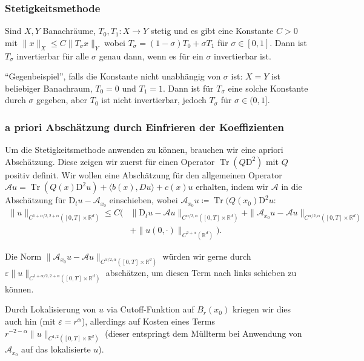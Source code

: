 \documentclass[11pt,a4paper]{scrartcl}
\newcommand{\R}{\mathbb{R}} %
\newcommand{\A}{\mathcal{A}}
\theoremstyle{plain}
\theoremstyle{definition}
\theoremstyle{remark}
\DeclareMathOperator{\Tr}{Tr}
\begin{document}
\subsubsection{Stetigkeitsmethode}

Sind $X,Y$ Banachräume, $T_0,T_1:X\to Y$ stetig und es gibt eine Konstante $C>0$ mit $\|x\|_X \leq C \|T_\sigma x\|_Y$ wobei $T_\sigma = (1-\sigma) T_0 + \sigma T_1$ für $\sigma\in [0,1]$. Dann ist $T_\sigma$ invertierbar für alle $\sigma$ genau dann, wenn es für ein $\sigma$ invertierbar ist.

\enquote{Gegenbeispiel}, falls die Konstante nicht unabhängig von $\sigma$ ist: $X=Y$ ist beliebiger Banachraum, $T_0=0$ und $T_1=1$. Dann ist für $T_\sigma$ eine solche Konstante durch $\sigma$ gegeben, aber $T_0$ ist nicht invertierbar, jedoch $T_\sigma$ für $\sigma\in (0,1]$.

\subsubsection{a priori Abschätzung durch Einfrieren der Koeffizienten}

Um die Stetigkeitsmethode anwenden zu können, brauchen wir eine apriori Abschätzung. Diese zeigen wir zuerst für einen Operator $\Tr(Q\mathrm{D}^2)$ mit $Q$ positiv definit. Wir wollen eine Abschätzung für den allgemeinen Operator $\A u = \Tr(Q(x)\mathrm{D}^2 u) + \langle b(x), Du\rangle + c(x)u$ erhalten, indem wir $\A$ in die Abschätzung für $\mathrm{D}_t u-\A_{x_0}$ einschieben, wobei $\A_{x_0} u\coloneqq \Tr(Q(x_0)\mathrm{D}^2 u$: 
%
\begin{align*}
\|u\|_{C^{1+\alpha/2,2+\alpha}([0,T]\times \R^d)} 
\leq C\big( & \|\mathrm{D}_t u-\A u\|_{C^{\alpha/2,\alpha}([0,T]\times \R^d)} 
+ \|\A_{x_0} u-\A u\|_{C^{\alpha/2,\alpha}([0,T]\times \R^d)} \\
 & 
+ \|u(0,\cdot)\|_{C^{2+\alpha}(\R^d)}
\big).\end{align*}

Die Norm $\|\A_{x_0} u-\A u\|_{C^{\alpha/2,\alpha}([0,T]\times \R^d)}$ würden wir gerne durch $\varepsilon \|u\|_{C^{1+\alpha/2,2+\alpha}([0,T]\times \R^d)}$ abschätzen, um diesen Term nach links schieben zu können.

Durch Lokalisierung von $u$ via Cutoff-Funktion auf $B_r(x_0)$ kriegen wir dies auch hin (mit $\varepsilon=r^\alpha$), allerdings auf Kosten eines Terms $r^{-2-\alpha}\|u\|_{C^{1,2}([0,T]\times \R^d)}$ (dieser entspringt dem Müllterm bei Anwendung von $\A_{x_0}$ auf das lokalisierte $u$).
\end{document}
